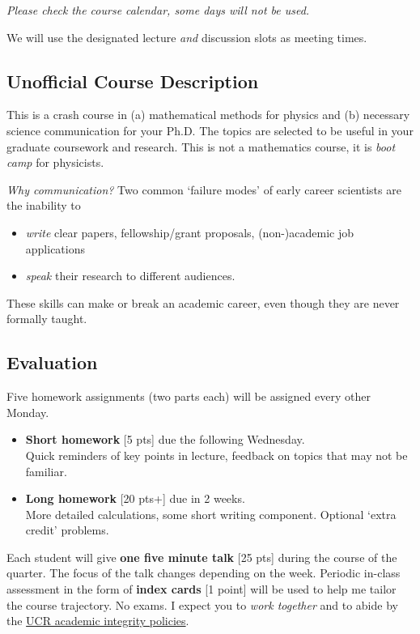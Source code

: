\documentclass[12pt]{article}
\numberwithin{equation}{section}    %
\begin{document}
\vspace{.5em}
\noindent \emph{Please check the course calendar, some days will not be used.}

\vspace{.5em}
\noindent We will use the designated lecture \emph{and} discussion slots as meeting times. 


\subsection*{Unofficial Course Description}


This is a crash course in (a) mathematical methods for physics and (b) necessary science communication for your Ph.D. The topics are selected to be useful in your graduate coursework and research. This is not a mathematics course, it is \emph{boot camp} for physicists. 

\vspace{.5em}
\noindent\emph{Why communication?} Two common `failure modes' of early career scientists are the inability to \begin{itemize}
	\item \emph{write} clear papers, fellowship/grant proposals, (non-)academic job applications
	\item \emph{speak} their research to different audiences.
\end{itemize} 
These skills can make or break an academic career, even though they are never formally taught. 

\subsection*{Evaluation}

Five homework assignments (two parts each) will be assigned every other Monday.
\begin{itemize}
	\item \textbf{Short homework} [5 pts] due the following Wednesday.\\ 
		Quick reminders of key points in lecture, feedback on topics that may not be familiar.
	\item \textbf{Long homework} [20 pts+] due in 2 weeks.\\ 
		More detailed calculations, some short writing component. Optional `extra credit' problems.
\end{itemize}
\noindent
Each student will give \textbf{one five minute talk} [25 pts] during the course of the quarter. The focus of the talk changes depending on the week. Periodic in-class assessment in the form of \textbf{index cards} [1 point] will be used to help me tailor the course trajectory. No exams. I expect you to \emph{work together} and to abide by the \href{http://conduct.ucr.edu/policies/academicintegrity.html}{UCR academic integrity policies}.
\end{document}
